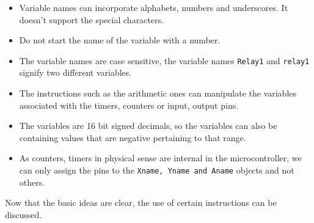 \documentclass[12pt]{article}
\begin{document}
\begin{itemize}
\item Variable names can incorporate alphabets, numbers and underscores. It doesn't support the special characters.
\item Do not start the name of the variable with a number.
\item The variable names are case sensitive, the variable names \texttt{Relay1} and \texttt{relay1} signify two different variables.
\item The instructions such as the arithmetic ones can manipulate the variables associated with the timers, counters or input, output pins.
\item The variables are 16 bit signed decimals, so the variables can also be containing values that are negative pertaining to that range.
\item As counters, timers in physical sense are internal in the microcontroller, we can only assign the pins to the \texttt{Xname, Yname and Aname} objects and not others.
\end{itemize}
Now that the basic ideas are clear, the use of certain instructions can be discussed. 
\end{document}
